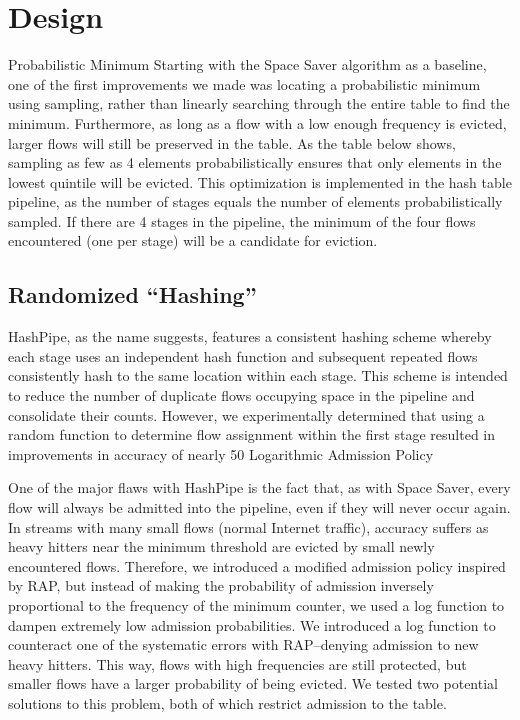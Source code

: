 \section{Design}
\label{sec:design}

Probabilistic Minimum
Starting with the Space Saver algorithm as a baseline, one of the first improvements we made was locating a probabilistic minimum using sampling, rather than linearly searching through the entire table to find the minimum. Furthermore, as long as a flow with a low enough frequency is evicted, larger flows will still be preserved in the table. As the table below shows, sampling as few as 4 elements probabilistically ensures that only elements in the lowest quintile will be evicted. This optimization is implemented in the hash table pipeline, as the number of stages equals the number of elements probabilistically sampled. If there are 4 stages in the pipeline, the minimum of the four flows encountered (one per stage) will be a candidate for eviction. 
 
\subsection{Randomized ``Hashing''}
HashPipe, as the name suggests, features a consistent hashing scheme whereby each stage uses an independent hash function and subsequent repeated flows consistently hash to the same location within each stage. This scheme is intended to reduce the number of duplicate flows occupying space in the pipeline and consolidate their counts. However, we experimentally determined that using a random function to determine flow assignment within the first stage resulted in improvements in accuracy of nearly 50%
Logarithmic Admission Policy

One of the major flaws with HashPipe is the fact that, as with Space Saver, every flow will always be admitted into the pipeline, even if they will never occur again. In streams with many small flows (normal Internet traffic), accuracy suffers as heavy hitters near the minimum threshold are evicted by small newly encountered flows. Therefore, we introduced a modified admission policy inspired by RAP, but instead of making the probability of admission inversely proportional to the frequency of the minimum counter, we used a log function to dampen extremely low admission probabilities. We introduced a log function to counteract one of the systematic errors with RAP--denying admission to new heavy hitters. This way, flows with high frequencies are still protected, but smaller flows have a larger probability of being evicted. We tested two potential solutions to this problem, both of which restrict admission to the table. 

